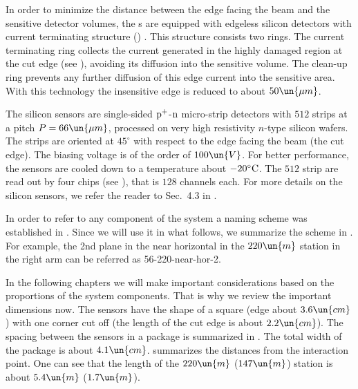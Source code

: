 In order to minimize the distance between the  edge facing the beam and the sensitive detector volumes, the s are equipped with edgeless silicon detectors with current terminating structure () . This structure consists two rings. The current terminating ring collects the current generated in the highly damaged region at the cut edge (see ), avoiding its diffusion into the sensitive volume. The clean-up ring prevents any further diffusion of this edge current into the sensitive area. With this technology the insensitive edge is reduced to about $50\un{\mu m}$.

The silicon sensors are single-sided $\rm p^+$-$\rm n$ micro-strip detectors with $512$ strips at a pitch $P = 66\un{\mu m}$, processed on very high resistivity
$n$-type silicon wafers. The strips are oriented at $45^\circ$ with respect to the edge facing the beam (the cut edge). The biasing voltage is of the order of $100\un{V}$. For better performance, the sensors are cooled down to a temperature about $-20^\circ\rm C$. The $512$ strip are read out by four  chips (see ), that is $128$ channels each. For more details on the silicon sensors, we refer the reader to Sec.~4.3 in .

In order to refer to any component of the  system a naming scheme was established in . Since we will use it in what follows, we summarize the scheme in . For example, the 2nd plane in the near horizontal  in the $220\un{m}$ station in the right arm can be referred as 56-220-near-hor-2.


In the following chapters we will make important considerations based on the proportions of the  system components. That is why we review the important dimensions now. The sensors have the shape of a square (edge about $3.6\un{cm}$) with one corner cut off (the length of the cut edge is about $2.2\un{cm}$). The spacing between the sensors in a package is summarized in . The total width of the package is about $4.1\un{cm}$.  summarizes the  distances from the interaction point. One can see that the length of the $220\un{m}$ ($147\un{m}$) station is about $5.4\un{m}$ ($1.7\un{m}$).

